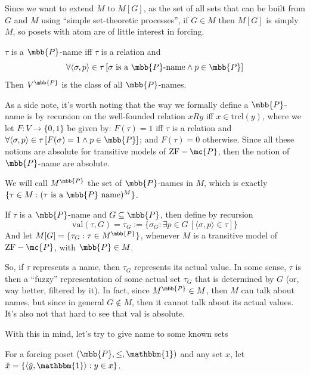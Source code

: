 Since we want to extend $M$ to $M[G]$, as the set of all sets that can be built from $G$ and $M$ using ``simple set-theoretic processes'', if $G\in M$ then $M[G]$ is simply $M$, so posets with atom are of little interest in forcing.

\begin{definition}{}{}
    $\tau$ is a $\mbb{P}$-name iff $\tau$ is a relation and
    $$\forall\langle\sigma,p\rangle\in\tau\,[\sigma\text{ is a }\mbb{P}\text{-name}\wedge p\in\mbb{P}]$$
    Then $V^{\mbb{P}}$ is the class of all $\mbb{P}$-names.
\end{definition}

As a side note, it's worth noting that the way we formally define a $\mbb{P}$-name is by recursion on the well-founded relation $xRy$ iff $x\in\text{trcl}(y)$, where we let $F:V\to\{0,1\}$ be given by: $F(\tau)=1$ iff $\tau$ is a relation and $\forall\langle\sigma,p\rangle\in\tau\,[F(\sigma)=1\wedge p\in\mbb{P}]$; and $F(\tau)=0$ otherwise. Since all these notions are absolute for transitive models of $\text{ZF}-\mc{P}$, then the notion of $\mbb{P}$-name are absolute.

We will call $M^{\mbb{P}}$ the set of $\mbb{P}$-names in $M$, which is exactly $\{\tau\in M:(\tau\text{ is a $\mbb{P}$ name})^M\}$.

\begin{definition}{}{}
    If $\tau$ is a $\mbb{P}$-name and $G\subseteq\mbb{P}$, then define by recursion
    $$\text{val}(\tau,G)=\tau_G:=\{\sigma_G:\exists p\in G\,[\langle\sigma,p\rangle\in\tau]\}$$
    And let $M[G]=\{\tau_G:\tau\in M^{\mbb{P}}\}$, whenever $M$ is a transitive model of $\text{ZF}-\mc{P}$, with $\mbb{P}\in M$.
\end{definition}

So, if $\tau$ represents a name, then $\tau_G$ represents its actual value. In some sense, $\tau$ is then a ``fuzzy'' representation of some actual set $\tau_G$ that is determined by $G$ (or, way better, filtered by it). In fact, since $M^{\mbb{P}}\in M$, then $M$ can talk about names, but since in general $G\notin M$, then it cannot talk about its actual values. It's also not that hard to see that $\text{val}$ is absolute.

With this in mind, let's try to give name to some known sets

\begin{definition}{}{}
    For a forcing poset $(\mbb{P},\leq,\mathbbm{1})$ and any set $x$, let $\check{x}=\{\langle\check{y},\mathbbm{1}\rangle:y\in x\}$.
\end{definition}

